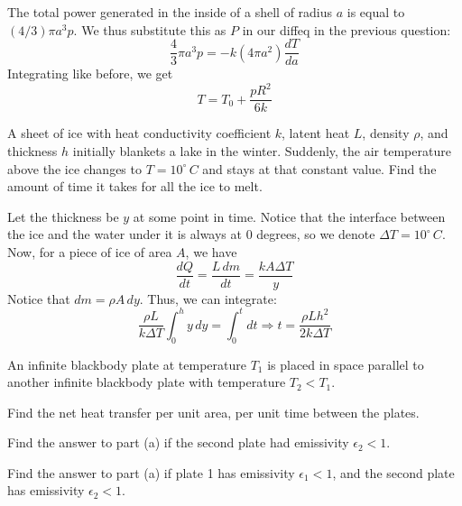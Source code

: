 \documentclass[11pt]{scrartcl}
\begin{document}
\begin{sol}
    The total power generated in the inside of a shell of radius $a$ is equal to $(4/3)\pi a^3p$. We thus substitute this as $P$ in our diffeq in the previous question: $$\frac43\pi a^3p=-k(4\pi a^2)\frac{dT}{da}$$Integrating like before, we get $$T=\boxed{T_0+\frac{pR^2}{6k}}$$
\end{sol}

\begin{prob}
    A sheet of ice with heat conductivity coefficient $k$, latent heat $L$, density $\rho$, and thickness $h$ initially blankets a lake in the winter. Suddenly, the air temperature above the ice changes to $T=10^\circ \, \unit{C}$ and stays at that constant value.  Find the amount of time it takes for all the ice to melt. 
\end{prob}

\begin{sol}
    Let the thickness be $y$ at some point in time. Notice that the interface between the ice and the water under it is always at 0 degrees, so we denote $\Delta T=10^\circ \, \unit{C}$. Now, for a piece of ice of area $A$, we have $$\frac{dQ}{dt}=\frac{L\, dm}{dt}=\frac{kA\Delta T}{y}$$
    Notice that $dm=\rho A\, dy$. Thus, we can integrate: $$\frac{\rho L}{k\Delta T}\int_0^hy\, dy=\int_0^tdt\Rightarrow t=\boxed{\frac{\rho Lh^2}{2k\Delta T}}$$
\end{sol}

\begin{prob}
    An infinite blackbody plate at temperature $T_1$ is placed in space parallel to another infinite blackbody plate with temperature $T_2<T_1$. 
    \begin{anum}
        \item Find the net heat transfer per unit area, per unit time between the plates.
        \item Find the answer to part (a) if the second plate had emissivity $\epsilon_2 <1$. 
        \item Find the answer to part (a) if plate 1 has emissivity $\epsilon_1<1$, and the second plate has emissivity $\epsilon_2<1$. 
    \end{anum}
\end{prob}
\end{document}
